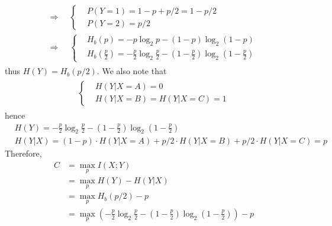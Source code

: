 \documentclass[a4paper,12pt]{article}
\begin{document}
\begin{enumerate}
\begin{align*}
\begin{aligned}
                    \Rightarrow \;\; & \left\{
                    \begin{aligned}
                        & P(Y = 1) = 1 - p + p/2 = 1 - p/2 \\
                        & P(Y = 2) = p/2
                    \end{aligned}
                    \right. \\ 
                    \Rightarrow \;\; & \left\{
                    \begin{aligned}
                        & H_b(p) = -p \log_2 p - (1 - p) \log_2 (1 - p) \\
                        & H_b(\frac{p}{2}) = -\frac{p}{2} \log_2 \frac{p}{2} - (1 - \frac{p}{2}) \log_2 (1 - \frac{p}{2})
                    \end{aligned}
                    \right.
                \end{aligned}
            \end{align*}
            thus $H(Y) = H_b(p/2)$. We also note that 
            \begin{align*}
                \begin{aligned}
                    \left\{
                    \begin{aligned}
                        & H(Y|X = A) = 0 \\
                        & H(Y|X = B) = H(Y|X = C) = 1
                    \end{aligned}
                    \right.
                \end{aligned}
            \end{align*}
            hence 
            \begin{align*}
                & H(Y) = -\frac{p}{2} \log_2 \frac{p}{2} - (1 - \frac{p}{2}) \log_2 (1 - \frac{p}{2}) \\ 
                & H(Y|X) = (1 - p) \cdot H(Y|X = A) + p/2 \cdot H(Y|X = B)  + p/2 \cdot H(Y|X = C) = p
            \end{align*}
            Therefore, 
            \begin{align*}
                C &= \max_{p} I(X;Y) \\
                  &= \max_{p} H(Y) - H(Y|X) \\
                  &= \max_{p} H_b(p/2) - p \\ 
                  &= \max_{p} \left( -\frac{p}{2} \log_2 \frac{p}{2} - (1 - \frac{p}{2}) \log_2 (1 - \frac{p}{2}) \right) - p
            \end{align*}

\end{enumerate}
\end{document}
